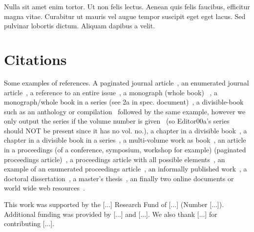 \documentclass[sigconf, nonacm]{acmart}
\begin{document}
Nulla sit amet enim tortor. Ut non felis lectus. Aenean quis felis faucibus,
efficitur magna vitae. Curabitur ut mauris vel augue tempor suscipit eget eget
lacus. Sed pulvinar lobortis dictum. Aliquam dapibus a velit.

\section{Citations}

Some examples of references. A paginated journal article~\cite{Abril07}, an
enumerated journal article~\cite{Cohen07}, a reference to an entire
issue~\cite{JCohen96}, a monograph (whole book) ~\cite{Kosiur01}, a
monograph/whole book in a series (see 2a in spec. document)~\cite{Harel79}, a
divisible-book such as an anthology or compilation~\cite{Editor00} followed by
the same example, however we only output the series if the volume number is
given~\cite{Editor00a} (so Editor00a's series should NOT be present since it
has no vol. no.), a chapter in a divisible book~\cite{Spector90}, a chapter in
a divisible book in a series~\cite{Douglass98}, a multi-volume work as
book~\cite{Knuth97}, an article in a proceedings (of a conference, symposium,
workshop for example) (paginated proceedings article)~\cite{Andler79}, a
proceedings article with all possible elements~\cite{Smith10}, an example of an
enumerated proceedings article~\cite{VanGundy07}, an informally published
work~\cite{Harel78}, a doctoral dissertation~\cite{Clarkson85}, a master's
thesis~\cite{anisi03}, an finally two online documents or world wide web
resources~\cite{Thornburg01, Ablamowicz07}.

\begin{acks}
  This work was supported by the [...] Research Fund of [...] (Number [...]). Additional funding was provided by [...] and [...]. We also thank [...] for contributing [...].
\end{acks}




\end{document}
